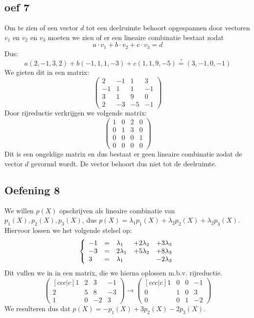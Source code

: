 \documentclass[lineaire_algebra_oplossingen.tex]{subfiles}
\begin{document}
\subsection*{oef 7}
Om te zien of een vector $d$ tot een deelruimte behoort opgespannen door vectoren $v_1$ en $v_2$ en $v_3$ moeten we zien of er een lineaire combinatie bestaat zodat  $$a\cdot v_1 + b\cdot v_2 + c\cdot v_3 = d$$
Dus:
$$a(2,-1,3,2) + b(-1,1,1,-3) + c(1,1,9,-5) \overset{?}{=} (3,-1,0,-1)$$
We gieten dit in een matrix:
$$
\begin{pmatrix}
2 & -1 & 1 &3\\
-1 & 1 & 1 & -1\\
3 & 1 &9 & 0\\
2 & -3 &-5& -1
\end{pmatrix}
$$
Door rijreductie verkrijgen we volgende matrix:
$$
\begin{pmatrix}
1&0&2&0\\
0&1&3&0\\
0&0&0&1\\
0&0&0&0
\end{pmatrix}
$$
Dit is een ongeldige matrix en dus bestaat er geen lineaire combinatie zodat de vector $d$ gevormd wordt. De vector behoort dus niet tot de deelruimte.

\subsection{Oefening 8}
We willen $p(X)$ opschrijven als lineaire combinatie van $p_1(X), p_2(X), p_3(X)$, dus $p(X) = \lambda_1 p_1(X) + \lambda_2 p_2(X) + \lambda_2 p_3(X)$.
Hiervoor lossen we het volgende stelsel op:
\[
\left\{
\begin{array}{l l l l l}
  -1 &= &\lambda_1 &+ 2 \lambda_2 &+ 3 \lambda_3\\
  -3 &= &2 \lambda_1 &+ 5 \lambda_2 &+ 8 \lambda_3\\
  3 &= &\lambda_1 &&- 2 \lambda_3
\end{array}
\right.
\]
Dit vullen we in in een matrix, die we hierna oplossen m.b.v. rijreductie.
\[
\begin{pmatrix}[ccc|c]
  1 & 2 & 3 & -1\\
  2 & 5 & 8 & -3\\
  1 & 0 & -2 & 3
\end{pmatrix}
\rightarrow
\begin{pmatrix}[ccc|c]
  1 & 0 & 0 & -1\\
  0 & 1 & 0 & 3\\
  0 & 0 & 1 & -2
\end{pmatrix}
\]
We resulteren dus dat $p(X) = - p_1(X) + 3 p_2(X) - 2 p_3(X)$.
\end{document}
